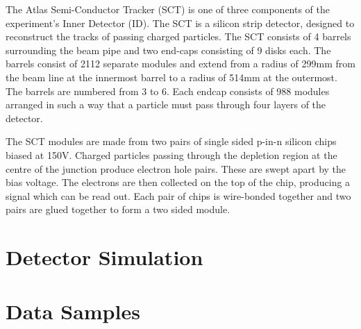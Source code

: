 The Atlas Semi-Conductor Tracker (SCT) is one of three components of the experiment's Inner Detector (ID). The SCT is a silicon strip detector, designed to reconstruct the tracks of passing charged particles. The SCT consists of 4 barrels surrounding the beam pipe and two end-caps consisting of 9 disks each. The barrels consist of 2112 separate modules and extend from a radius of 299mm from the beam line at the innermost barrel to a radius of 514mm at the outermost. The barrels are numbered from 3 to 6. Each endcap consists of 988 modules arranged in such a way that a particle must pass through four layers of the detector.

The SCT modules are made from two pairs of single sided p-in-n silicon chips biased at 150V. Charged particles passing through the depletion region at the centre of the junction produce electron hole pairs. These are swept apart by the bias voltage. The electrons are then collected on the top of the chip, producing a signal which can be read out. Each pair of chips is wire-bonded together and two pairs are glued together to form a two sided module.

\section{Detector Simulation}
\section{Data Samples}
